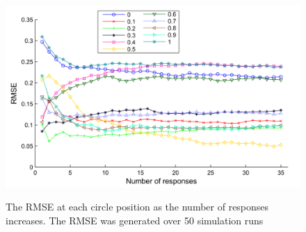\begin{figure}
	\centering
	\includegraphics[scale=1]{line_fusion_RMSE_LR.png}
	\label{Figure: fusion_RMSE_LR }
	\caption{The RMSE at each circle position as the number of responses increases. The RMSE was generated over 50 simulation runs}
\end{figure}






